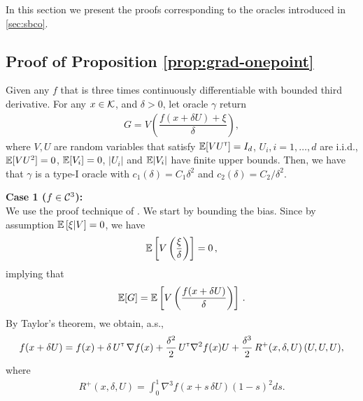 In this section we present the proofs corresponding to the oracles introduced in \cref{sec:sbco}.

\subsection{Proof of Proposition \ref{prop:grad-onepoint}}



\begin{proposition}
\label{prop:grad-1spsa}
Given any $f$ that is three times continuously differentiable with bounded third derivative.
For any $x \in \mathcal{K}$, and $\delta >0$, let oracle $\gamma$ return
\begin{align}
G =  V \left(\dfrac{f(x+\delta U) + \xi}{\delta}\right),
 \label{eq:onesp}
\end{align}
where $V, U$ are random variables that satisfy $\mathbb{E}[V U^\mathsf{\scriptscriptstyle T}] = I_d$, $U_i, i=1,\ldots,d$ are i.i.d., $\mathbb{E}[ V U^2] = 0$, $\mathbb{E}[V_i]=0$, $|U_i|$ and $\mathbb{E}|V_i|$ have finite upper bounds.
Then, we have that $\gamma$ is a type-I oracle with $c_1(\delta) = C_1 \delta^2$ and $c_2(\delta) = C_2/\delta^2$.
\end{proposition}
\fi
\textbf{Case 1 ($f \in \mathcal{C}^3$): }\ \\
We use the proof technique of \cite{spall1997one}.
We start by bounding the bias.
Since by assumption $\mathbb{E}\left[ \xi|V\right]=0$, we have
\begin{align*}
\mathbb{E}\left[  V\left(\dfrac{\xi}{\delta}\right) \right]= 0\,,
\end{align*}
implying that
\begin{align*}
\mathbb{E}[G] =  \mathbb{E}\left[ V \left(\dfrac{f(x+\delta U) }{\delta}\right)\right] \,.
\end{align*}
By Taylor's theorem, we obtain, a.s.,
\begin{align*}
f(x + \delta U) =
 f(x)
 +\delta\,  U^\mathsf{\scriptscriptstyle T}\,\nabla f(x)
  + \frac{\delta^2}{2}\, U^\mathsf{\scriptscriptstyle T} \nabla^2 f(x) U
  +  \frac{\delta^3}{2} \, R^{+}(x,\delta,U) \,(U, U, U),
\end{align*}
where
\begin{align}
 R^{+}(x,\delta,U)= \int_0^1  \nabla^3 f(  x + s \, \delta U ) (1-s)^2 ds. \label{eq:taylor-r}
\end{align}
